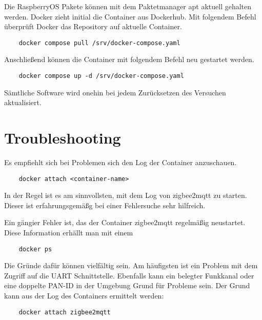 Die RaspberryOS Pakete können mit dem Paktetmanager apt aktuell gehalten werden. Docker zieht initial die Container aus Dockerhub.
Mit folgendem Befehl überprüft Docker das Repository auf aktuelle Container.

\begin{lstlisting}
    docker compose pull /srv/docker-compose.yaml
\end{lstlisting}

Anschließend können die Container mit folgendem Befehl neu gestartet werden.

\begin{lstlisting}
    docker compose up -d /srv/docker-compose.yaml
\end{lstlisting}

Sämtliche Software wird onehin bei jedem Zurücksetzen des Versuchen aktualisiert.

\section{Troubleshooting}

Es empfiehlt sich bei Problemen sich den Log der Container anzuschauen.

\begin{lstlisting}
    docker attach <container-name>
\end{lstlisting}

In der Regel ist es am sinnvollsten, mit dem Log von zigbee2mqtt zu starten. Dieser ist erfahrungsgemäßg bei einer Fehlersuche sehr hilfreich.

Ein gängier Fehler ist, das der Container zigbee2mqtt regelmäßig neustartet. Diese Information erhällt man mit einem
\begin{lstlisting}
    docker ps
\end{lstlisting}
Die Gründe dafür können vielfältig sein. Am häufigsten ist ein Problem mit dem Zugriff auf die UART Schnittstelle. Ebenfalls kann ein belegter Funkkanal
oder eine doppelte PAN-ID in der Umgebung Grund für Probleme sein. 
Der Grund kann aus der Log des Containers ermittelt werden:
\begin{lstlisting}
    docker attach zigbee2mqtt
\end{lstlisting}



